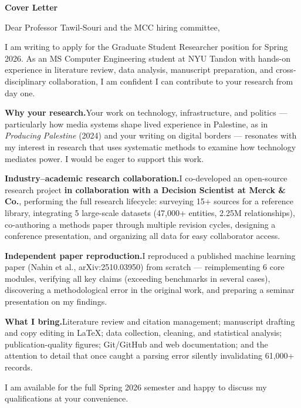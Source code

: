 \documentclass[12pt,letterpaper]{article}
\begin{document}
\begin{center}
{\Large \textbf{Cover Letter}}
\end{center}

\vspace{0.5em}

Dear Professor Tawil-Souri and the MCC hiring committee,

I am writing to apply for the Graduate Student Researcher position for Spring 2026. As an MS Computer Engineering student at NYU Tandon with hands-on experience in literature review, data analysis, manuscript preparation, and cross-disciplinary collaboration, I am confident I can contribute to your research from day one.

\textbf{Why your research.}\quad Your work on technology, infrastructure, and politics --- particularly how media systems shape lived experience in Palestine, as in \textit{Producing Palestine} (2024) and your writing on digital borders --- resonates with my interest in research that uses systematic methods to examine how technology mediates power. I would be eager to support this work.

\textbf{Industry--academic research collaboration.}\quad I co-developed an open-source research project \textbf{in collaboration with a Decision Scientist at Merck \& Co.}, performing the full research lifecycle: surveying 15+ sources for a reference library, integrating 5 large-scale datasets (47,000+ entities, 2.25M relationships), co-authoring a methods paper through multiple revision cycles, designing a conference presentation, and organizing all data for easy collaborator access.

\textbf{Independent paper reproduction.}\quad I reproduced a published machine learning paper (Nahin et al., arXiv:2510.03950) from scratch --- reimplementing 6 core modules, verifying all key claims (exceeding benchmarks in several cases), discovering a methodological error in the original work, and preparing a seminar presentation on my findings.

\textbf{What I bring.}\quad Literature review and citation management; manuscript drafting and copy editing in \LaTeX{}; data collection, cleaning, and statistical analysis; publication-quality figures; Git/GitHub and web documentation; and the attention to detail that once caught a parsing error silently invalidating 61,000+ records.

I am available for the full Spring 2026 semester and happy to discuss my qualifications at your convenience.
\end{document}
